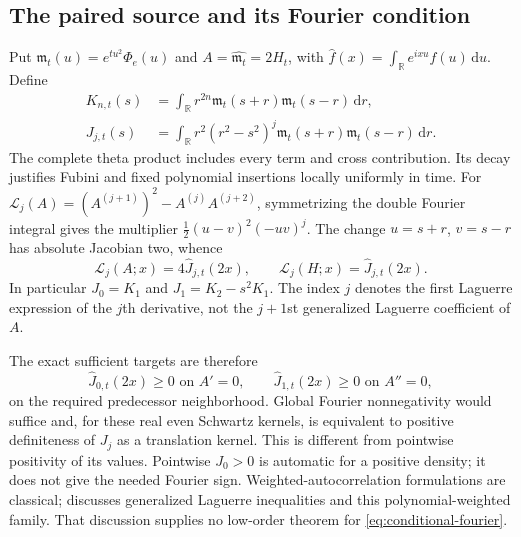 \documentclass[11pt]{article}
\theoremstyle{definition}
\theoremstyle{remark}
\newcommand{\dd}{\,\mathrm d}
\begin{document}
\subsection{The paired source and its Fourier condition}

Put $\mathfrak m_t(u)=e^{tu^2}\Phi_e(u)$ and $A=\widehat{\mathfrak m_t}=2H_t$, with
$\widehat f(x)=\int_{\mathbb R}e^{ixu}f(u)\dd u$. Define
\begin{align}
 K_{n,t}(s)&=\int_{\mathbb R}r^{2n}\mathfrak m_t(s+r)\mathfrak m_t(s-r)\dd r,\nonumber\\
 J_{j,t}(s)&=\int_{\mathbb R}r^2(r^2-s^2)^j
       \mathfrak m_t(s+r)\mathfrak m_t(s-r)\dd r.\label{eq:laguerre-kernels}
\end{align}
The complete theta product includes every term and cross contribution.
Its decay justifies Fubini and fixed polynomial insertions locally
uniformly in time. For
$\mathscr L_j(A)=(A^{(j+1)})^2-A^{(j)}A^{(j+2)}$, symmetrizing the
double Fourier integral gives the multiplier
$\tfrac12(u-v)^2(-uv)^j$. The change $u=s+r$, $v=s-r$ has absolute
Jacobian two, whence
\begin{equation}
 \mathscr L_j(A;x)=4\widehat J_{j,t}(2x),\qquad
 \mathscr L_j(H;x)=\widehat J_{j,t}(2x).
 \label{eq:laguerre-fourier}
\end{equation}
In particular $J_0=K_1$ and $J_1=K_2-s^2K_1$. The index $j$ denotes
the first Laguerre expression of the $j$th derivative, not the $j+1$st
generalized Laguerre coefficient of $A$.

The exact sufficient targets are therefore
\begin{equation}
 \widehat J_{0,t}(2x)\ge0\text{ on }A'=0,\qquad
 \widehat J_{1,t}(2x)\ge0\text{ on }A''=0,
 \label{eq:conditional-fourier}
\end{equation}
on the required predecessor neighborhood. Global Fourier nonnegativity
would suffice and, for these real even Schwartz kernels, is equivalent
to positive definiteness of $J_j$ as a translation kernel. This is
different from pointwise positivity of its values. Pointwise $J_0>0$
is automatic for a positive density; it does not give the needed
Fourier sign. Weighted-autocorrelation formulations are classical;
\cite[Theorem 3.7 and Open Problems 4.7, 4.11]{csordas} discusses
generalized Laguerre inequalities and this polynomial-weighted family.
That discussion supplies no low-order theorem for
\eqref{eq:conditional-fourier}.
\end{document}
